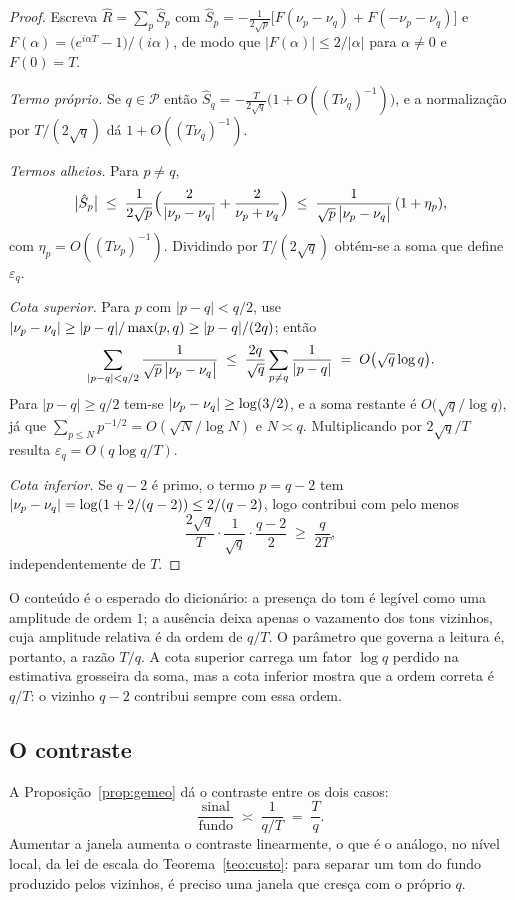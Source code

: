 \begin{proof}
Escreva $\hat R=\sum_p \hat S_p$ com
$\hat S_p=-\frac{1}{2\sqrt p}\bigl[F(\nu_p-\nu_q)+F(-\nu_p-\nu_q)\bigr]$ e
$F(\alpha)=\bigl(e^{i\alpha T}-1\bigr)/(i\alpha)$, de modo que
$|F(\alpha)|\le 2/|\alpha|$ para $\alpha\neq0$ e $F(0)=T$.

\emph{Termo próprio.} Se $q\in\mathcal P$ então
$\hat S_q=-\tfrac{T}{2\sqrt q}\bigl(1+O((T\nu_q)^{-1})\bigr)$, e a normalização por
$T/(2\sqrt q)$ dá $1+O((T\nu_q)^{-1})$.

\emph{Termos alheios.} Para $p\neq q$,
\[
  \bigl|\hat S_p\bigr| \;\le\;
  \frac{1}{2\sqrt p}\Bigl(\frac{2}{|\nu_p-\nu_q|}+\frac{2}{\nu_p+\nu_q}\Bigr)
  \;\le\; \frac{1}{\sqrt p\,\bigl|\nu_{p}-\nu_{q}\bigr|}\,(1+\eta_p),
\]
com $\eta_p=O((T\nu_p)^{-1})$. Dividindo por $T/(2\sqrt q)$ obtém-se a soma que
define $\varepsilon_q$.

\emph{Cota superior.} Para $p$ com $|p-q|<q/2$, use
$|\nu_{p}-\nu_{q}|\ge |p-q|/\max(p,q)\ge |p-q|/(2q)$; então
\[
  \sum_{|p-q|<q/2}\frac{1}{\sqrt p\,\bigl|\nu_{p}-\nu_{q}\bigr|}
  \;\le\; \frac{2q}{\sqrt q}\sum_{p\neq q}\frac{1}{|p-q|}
  \;=\; O\bigl(\sqrt q\log q\bigr).
\]
Para $|p-q|\ge q/2$ tem-se $|\nu_{p}-\nu_{q}|\ge\log(3/2)$, e a soma restante é
$O\bigl(\sqrt q/\log q\bigr)$, já que $\sum_{p\le N}p^{-1/2}=O(\sqrt N/\log N)$ e
$N\asymp q$. Multiplicando por $2\sqrt q/T$ resulta $\varepsilon_q=O(q\log q/T)$.

\emph{Cota inferior.} Se $q-2$ é primo, o termo $p=q-2$ tem
$|\nu_{p}-\nu_{q}|=\log(1+2/(q-2))\le 2/(q-2)$, logo contribui com pelo menos
\[
  \frac{2\sqrt q}{T}\cdot\frac{1}{\sqrt q}\cdot\frac{q-2}{2}\;\ge\;\frac{q}{2T},
\]
independentemente de $T$.
\end{proof}

O conteúdo é o esperado do dicionário: a presença do tom é legível como uma
amplitude de ordem $1$; a ausência deixa apenas o vazamento dos tons vizinhos,
cuja amplitude relativa é da ordem de $q/T$. O parâmetro que governa a leitura é,
portanto, a razão $T/q$. A cota superior carrega um fator $\log q$ perdido na
estimativa grosseira da soma, mas a cota inferior mostra que a ordem correta é
$q/T$: o vizinho $q-2$ contribui sempre com essa ordem.

\subsection{O contraste}

A Proposição~\ref{prop:gemeo} dá o contraste entre os dois casos:
\[
  \frac{\text{sinal}}{\text{fundo}} \;\asymp\; \frac{1}{q/T} \;=\; \frac{T}{q}.
\]
Aumentar a janela aumenta o contraste linearmente, o que é o análogo, no nível
local, da lei de escala do Teorema~\ref{teo:custo}: para separar um tom do fundo
produzido pelos vizinhos, é preciso uma janela que cresça com o próprio $q$.


